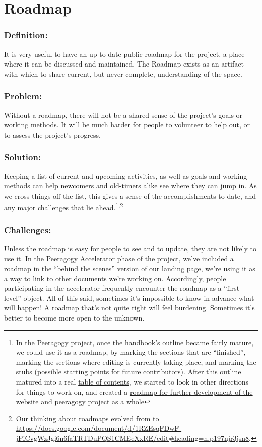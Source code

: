 \section{Roadmap} \label{sec:Roadmap}

\subsubsection*{Definition:} It is very useful to have an up-to-date public
roadmap for the project, a place where it can be discussed and
maintained. The Roadmap exists as an artifact with which to share
current, but never complete, understanding of the space.

\subsubsection*{Problem:} Without a roadmap, there will not be a shared sense of
the project's goals or working methods. It will be much harder for
people to volunteer to help out, or to assess the project's progress.

\subsubsection*{Solution:} Keeping a list of current and upcoming activities, as
well as goals and working methods can
help \href{http://peeragogy.org/practice/heuristics/newcomer/}{newcomers}
and old-timers alike see where they can jump in. As we cross things off
the list, this gives a sense of the accomplishments to date, and any
major challenges that lie ahead.\footnote{In the Peeragogy project, once the handbook's outline became fairly
  mature, we could use it as a roadmap, by marking the sections that are
  ``finished'', marking the sections where editing is currently taking
  place, and marking the stubs (possible starting points for future
  contributors). After this outline matured into a
  real \href{http://peeragogy.org/table-of-contents/}{table of contents},
  we started to look in other directions for things to work on, and
  created a \href{http://peeragogy.org/peeragogy-org-roadmap/}{roadmap
  for further development of the website and peeragogy project as a
  whole}}\textsuperscript{,}\footnote{Our thinking about roadmaps evolved from \cite{corneli2013roadmaps} to \url{https://docs.google.com/document/d/1RZEsqFDwF-jPiCvgWzJgi6n6faTRTDuPQS1CMEeXxRE/edit\#heading=h.p197njr3jsn8}.}

\subsubsection*{Challenges:} Unless the roadmap is easy for people to see and to
update, they are not likely to use it. In the Peeragogy Accelerator
phase of the project, we've included a roadmap in the ``behind the
scenes'' version of our landing page, we're using it as a way to link to
other documents we're working on. Accordingly, people participating in
the accelerator frequently encounter the roadmap as a ``first level''
object. All of this said, sometimes it's impossible to know in advance
what will happen! A roadmap that's not quite right will feel burdening.
Sometimes it's better to become more open to the unknown.

